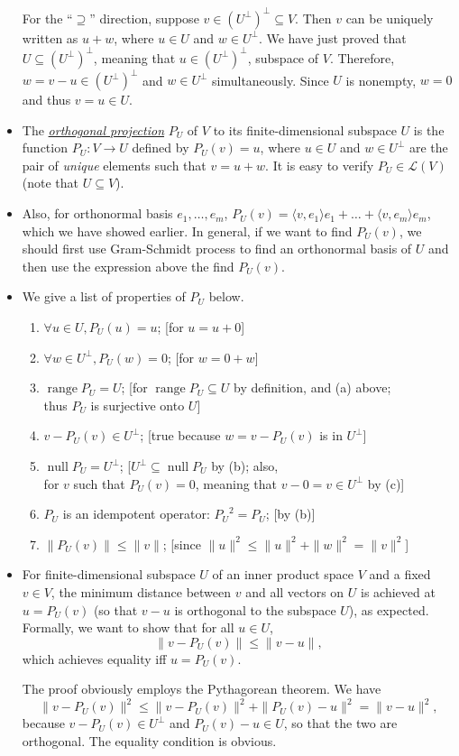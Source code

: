 \documentclass[11pt]{article}
\newcommand{\df}[1]{\ul{\textit{\textsf{#1}}}}
\newcommand{\n}{\operatorname{null}}
\renewcommand{\r}{\operatorname{range}}
\newcommand{\inp}[2]{\langle #1, #2 \rangle}
\newcommand{\nm}[1]{\|#1\|}
\newcommand{\LV}{\mathcal{L}(V)}
\begin{document}
\begin{itemize}
    For the ``$\supseteq$'' direction, suppose $v \in (U^\perp)^\perp \subseteq V$. Then $v$ can be uniquely written as $u+w$, where $u \in U$ and $w \in U^\perp$. We have just proved that $U \subseteq (U^\perp)^\perp$, meaning that $u \in (U^\perp)^\perp$, subspace of $V$. Therefore, $w = v-u \in (U^\perp)^\perp$ and $w \in U^\perp$ simultaneously. Since $U$ is nonempty, $w = 0$ and thus $v = u \in U$.
    \item The \df{orthogonal projection} $P_U$ of $V$ to its finite-dimensional subspace $U$ is the function $P_U: V \to U$ defined by $P_U(v) = u$, where $u \in U$ and $w \in U^\perp$ are the pair of \emph{unique} elements such that $v = u+w$. It is easy to verify $P_U \in \LV$ (note that $U \subseteq V$).
    \item Also, for orthonormal basis $e_1,\dots,e_m$, $P_U(v) = \inp{v}{e_1}e_1+\dots+\inp{v}{e_m}e_m$, which we have showed earlier. In general, if we want to find $P_U(v)$, we should first use Gram-Schmidt process to find an orthonormal basis of $U$ and then use the expression above the find $P_U(v)$.
    \item We give a list of properties of $P_U$ below.
    \begin{enumerate}[label=(\alph*)]
        \item $\forall u \in U, P_U(u) = u$; [for $u = u+0$]
        \item $\forall w \in U^\perp, P_U(w) = 0$; [for $w = 0+w$]
        \item $\r P_U = U$; [for $\r P_U \subseteq U$ by definition, and (a) above; \\ thus $P_U$ is surjective onto $U$]
        \item $v - P_U(v) \in U^\perp$; [true because $w = v - P_U(v)$ is in $U^\perp$]
        \item $\n P_U = U^\perp$; [$U^\perp \subseteq \n P_U$ by (b); also, \\ for $v$ such that $P_U(v) = 0$, meaning that $v - 0 = v \in U^\perp$ by (c)]
        \item $P_U$ is an idempotent operator: ${P_U}^2 = P_U$; [by (b)]
        \item $\nm{P_U(v)} \leq \nm{v}$; [since $\nm{u}^2 \leq \nm{u}^2 + \nm{w}^2 = \nm{v}^2$]
    \end{enumerate}
    \item For finite-dimensional subspace $U$ of an inner product space $V$ and a fixed $v \in V$, the minimum distance between $v$ and all vectors on $U$ is achieved at $u = P_U(v)$ (so that $v - u$ is orthogonal to the subspace $U$), as expected. Formally, we want to show that for all $u \in U$, $$\nm{v - P_U(v)} \leq \nm{v-u},$$ which achieves equality iff $u = P_U(v)$.
    
    The proof obviously employs the Pythagorean theorem. We have
    \begin{equation*}
        \nm{v - P_U(v)}^2 \leq \nm{v - P_U(v)}^2+\nm{P_U(v) - u}^2 = \nm{v - u}^2,
    \end{equation*}
    because $v - P_U(v) \in U^\perp$ and $P_U(v) - u \in U$, so that the two are orthogonal. The equality condition is obvious.
\end{itemize}
\end{document}
